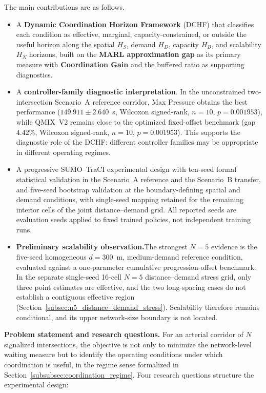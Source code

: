 \documentclass[review,12pt]{elsarticle}
\begin{document}
The main contributions are as follows.
\begin{itemize}
\item A \textbf{Dynamic Coordination Horizon Framework} (DCHF) that classifies each condition as effective, marginal, capacity-constrained, or outside the useful horizon along the spatial $H_S$, demand $H_D$, capacity $H_B$, and scalability $H_N$ horizons, built on the \textbf{MARL approximation gap} as its primary measure with \textbf{Coordination Gain} and the buffered ratio as supporting diagnostics.

\item A \textbf{controller-family diagnostic interpretation}. In the unconstrained two-intersection Scenario~A reference corridor, Max Pressure obtains the best performance ($149.911 \pm 2.640$~s, Wilcoxon signed-rank, $n=10$, $p=0.001953$), while QMIX~V2 remains close to the optimized fixed-offset benchmark (gap $4.42\%$, Wilcoxon signed-rank, $n=10$, $p=0.001953$). This supports the diagnostic role of the DCHF: different controller families may be appropriate in different operating regimes.

\item A progressive SUMO--TraCI experimental design with ten-seed formal statistical validation in the Scenario~A reference and the Scenario~B transfer, and five-seed bootstrap validation at the boundary-defining spatial and demand conditions, with single-seed mapping retained for the remaining interior cells of the joint distance--demand grid. All reported seeds are evaluation seeds applied to fixed trained policies, not independent training runs.

\item \textbf{Preliminary scalability observation.}\newline The strongest $N=5$ evidence is the five-seed homogeneous $d=300$~m, medium-demand reference condition, evaluated against a one-parameter cumulative progression-offset benchmark. In the separate single-seed 16-cell $N=5$ distance--demand stress grid, only three point estimates are effective, and the two long-spacing cases do not establish a contiguous effective region (Section~\ref{subsec:n5_distance_demand_stress}). Scalability therefore remains conditional, and its upper network-size boundary is not located.
\end{itemize}

\textbf{Problem statement and research questions.} For an arterial corridor of $N$ signalized intersections, the objective is not only to minimize the network-level waiting measure but to identify the operating conditions under which coordination is useful, in the regime sense formalized in Section~\ref{subsubsec:coordination_regime}. Four research questions structure the experimental design:
\end{document}
